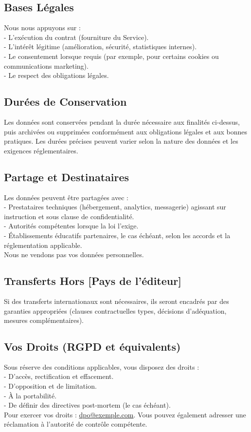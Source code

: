 \documentclass[12pt]{article}
\makeatletter
\newcommand{\Pays}{[Pays de l'éditeur]}
\newcommand{\ContactDPO}{dpo@exemple.com}
\makeatother
\begin{document}
\subsection{Bases Légales}
Nous nous appuyons sur :\\
- L'exécution du contrat (fourniture du Service).\\
- L'intérêt légitime (amélioration, sécurité, statistiques internes).\\
- Le consentement lorsque requis (par exemple, pour certains cookies ou communications marketing).\\
- Le respect des obligations légales.

\subsection{Durées de Conservation}
Les données sont conservées pendant la durée nécessaire aux finalités ci-dessus, puis archivées ou supprimées conformément aux obligations légales et aux bonnes pratiques. Les durées précises peuvent varier selon la nature des données et les exigences réglementaires.

\subsection{Partage et Destinataires}
Les données peuvent être partagées avec :\\
- Prestataires techniques (hébergement, analytics, messagerie) agissant sur instruction et sous clause de confidentialité.\\
- Autorités compétentes lorsque la loi l'exige.\\
- Établissements éducatifs partenaires, le cas échéant, selon les accords et la réglementation applicable.\\
Nous ne vendons pas vos données personnelles.

\subsection{Transferts Hors \Pays}
Si des transferts internationaux sont nécessaires, ils seront encadrés par des garanties appropriées (clauses contractuelles types, décisions d'adéquation, mesures complémentaires).

\subsection{Vos Droits (RGPD et équivalents)}
Sous réserve des conditions applicables, vous disposez des droits :\\
- D'accès, rectification et effacement.\\
- D'opposition et de limitation.\\
- À la portabilité.\\
- De définir des directives post-mortem (le cas échéant).\\
Pour exercer vos droits : \href{mailto:\ContactDPO}{\ContactDPO}. Vous pouvez également adresser une réclamation à l'autorité de contrôle compétente.
\end{document}
